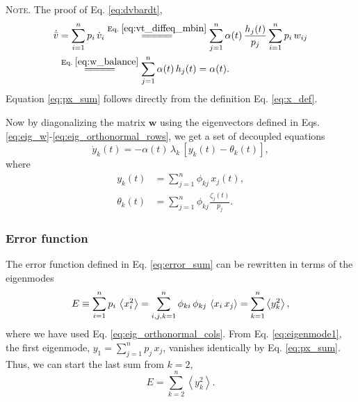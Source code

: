 \documentclass[reprint, floatfix]{revtex4-1}
\newcommand{\note}[1]{{\color{DarkGreen}\footnotesize \textsc{Note.} #1}}
\newcommand{\Err}{E}
\begin{document}
\note{The proof of Eq. \eqref{eq:dvbardt},
$$
\begin{aligned}
  \dot{ \bar v }
  &=
  \sum_{i = 1}^n p_i \, \dot v_i
  \stackrel{\mathrm{Eq.\; \eqref{eq:vt_diffeq_mbin}}}
  {=\joinrel=\joinrel=\joinrel=\joinrel=}
  \sum_{j = 1}^n \alpha(t) \, \frac{ h_j(t) } { p_j }
                 \sum_{ i = 1 }^{n} p_i \, w_{ij}
  \\
  &
  \stackrel{\mathrm{Eq.\; \eqref{eq:w_balance}}}
  {=\joinrel=\joinrel=\joinrel=\joinrel=}
  \sum_{j = 1}^n \alpha(t) \, h_j(t)
  =
  \alpha(t).
\end{aligned}
$$
Equation \eqref{eq:px_sum} follows directly from the definition
Eq. \eqref{eq:x_def}.
}

Now by diagonalizing the matrix $\mathbf w$
using the eigenvectors defined in Eqs.
\eqref{eq:eig_w}-\eqref{eq:eig_orthonormal_rows},
we get a set of decoupled equations
%
\begin{equation}
  \dot y_k(t)
  =
  -\alpha(t) \, \lambda_k \, [y_k(t) - \theta_k(t)],
\label{eq:yt_diffeq}
\end{equation}
%
where
\begin{align}
  y_k(t)
  &=
  \sum_{j=1}^n
    \phi_{kj} \, x_j(t)
  ,
  \label{eq:y_def}
  \\
  \theta_k(t)
  &=
  \sum_{j=1}^n
    \phi_{kj} \frac{ \zeta_j(t) }
                   { p_j        }
  .
  \label{eq:eta_def}
\end{align}



\subsubsection{Error function}



The error function defined in Eq. \eqref{eq:error_sum}
can be rewritten in terms of the eigenmodes
\begin{align}
  \Err
  \equiv
  \sum_{i = 1}^n p_i \,
    \left\langle x_i^2 \right\rangle
  =
  \sum_{i, j, k=1}^n \phi_{ki} \, \phi_{kj} \,
    \left\langle x_i \, x_j \right\rangle
  =
  \sum_{k = 1}^n
    \left\langle
      y_k^2
    \right\rangle
  ,
\notag
\end{align}
%
where we have used Eq. \eqref{eq:eig_orthonormal_cols}.
%
From Eq. \eqref{eq:eigenmode1},
the first eigenmode, $y_1 = \sum_{j=1}^n p_j \, x_j$,
vanishes identically by Eq. \eqref{eq:px_sum}.
%
Thus, we can start the last sum %
from $k = 2$,
\begin{equation}
  \Err
  =
  \sum_{k = 2}^n
    \left\langle
      y_k^2
    \right\rangle
  .
\label{eq:y2_sum}
\end{equation}
\end{document}
